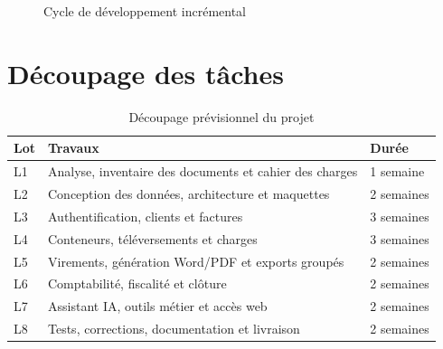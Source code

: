 \documentclass[12pt,a4paper,oneside]{report}
\begin{document}
\begin{figure}[H]\centering
{}
\caption{Cycle de développement incrémental}
\end{figure}

\section{Découpage des tâches}
\begin{table}[H]\centering
\caption{Découpage prévisionnel du projet}
\begin{tabularx}{\textwidth}{p{1.2cm}Y p{2cm}}
\toprule \textbf{Lot} & \textbf{Travaux} & \textbf{Durée}\\ \midrule
L1 & Analyse, inventaire des documents et cahier des charges & 1 semaine\\
L2 & Conception des données, architecture et maquettes & 2 semaines\\
L3 & Authentification, clients et factures & 3 semaines\\
L4 & Conteneurs, téléversements et charges & 3 semaines\\
L5 & Virements, génération Word/PDF et exports groupés & 2 semaines\\
L6 & Comptabilité, fiscalité et clôture & 2 semaines\\
L7 & Assistant IA, outils métier et accès web & 2 semaines\\
L8 & Tests, corrections, documentation et livraison & 2 semaines\\
\bottomrule
\end{tabularx}
\end{table}
\end{document}
